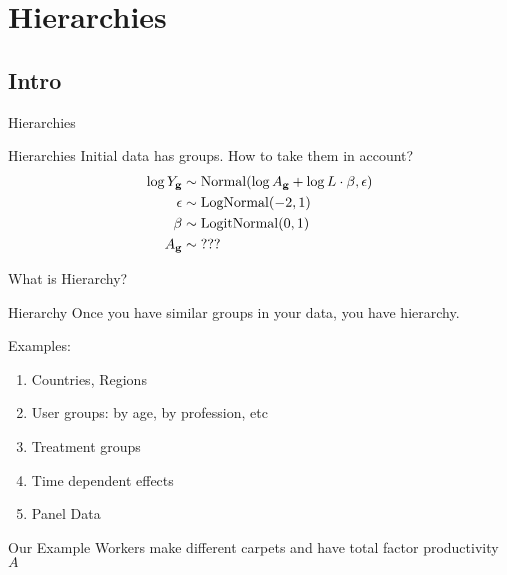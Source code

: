 \documentclass{beamer}
\begin{document}
\section{Hierarchies}
\subsection{Intro}
\begin{frame}{}
    \centering \Huge Hierarchies
\end{frame}
\begin{frame}{Hierarchies}
Initial data has groups. How to take them in account?
\begin{align*}
        \log Y_{\textbf{g}} &\sim \operatorname{Normal}(\log A_{\textbf{g}} + \log L \cdot \beta, {\epsilon})\\
        {\epsilon} &\sim \operatorname{LogNormal}(-2, 1)\\
        \beta &\sim \operatorname{LogitNormal}(0, 1)\\
        A_{\textbf{g}} &\sim \text{???}\\
    \end{align*}
\end{frame}
\begin{frame}{What is Hierarchy?}
    \begin{block}{Hierarchy}
    Once you have similar groups in your data, you have hierarchy.
    \end{block}
    Examples:
    \begin{enumerate}
        \item Countries, Regions
        \item User groups: by age, by profession, etc
        \item Treatment groups
        \item Time dependent effects
        \item Panel Data
    \end{enumerate}
    \begin{block}{Our Example}
    Workers make different carpets and have total factor
productivity $A$
    \end{block}
\end{frame}
\end{document}
